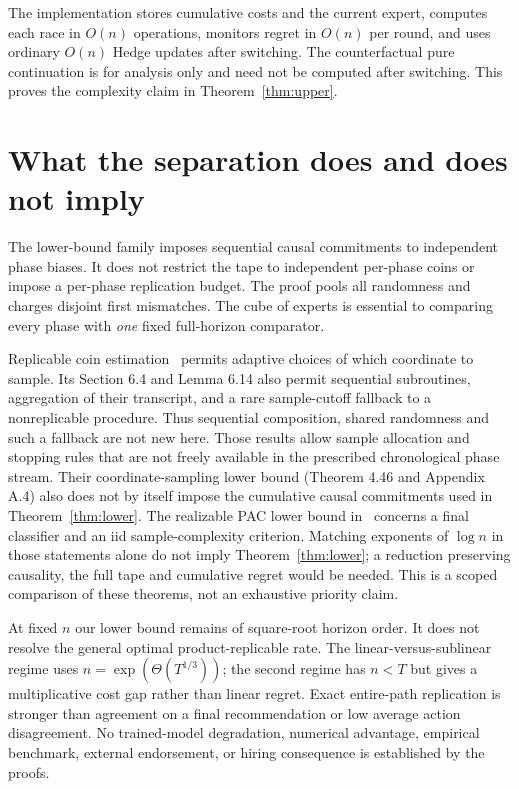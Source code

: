\documentclass[11pt]{article}
\newcommand{\1}{\mathbf 1}
\begin{document}
The implementation stores cumulative costs and the current expert,
computes each race in $O(n)$ operations, monitors regret in $O(n)$
per round, and uses ordinary $O(n)$ Hedge updates after switching.
The counterfactual pure continuation is for analysis only and need
not be computed after switching. This proves the complexity
claim in Theorem~\ref{thm:upper}.

\section{What the separation does and does not imply}\label{sec:discussion}

The lower-bound family imposes sequential causal commitments to
independent phase biases. It does not restrict the tape to independent
per-phase coins or impose a per-phase replication budget.
The proof pools all randomness and charges disjoint first mismatches.
The cube of experts is essential to comparing every phase with
\emph{one} fixed full-horizon comparator.

Replicable coin estimation~\cite{HIKLY} permits adaptive choices of
which coordinate to sample. Its Section 6.4 and Lemma 6.14 also permit
sequential subroutines, aggregation of their transcript, and a rare
sample-cutoff fallback to a nonreplicable procedure. Thus sequential
composition, shared randomness and such a fallback are not new here.
Those results allow sample allocation and stopping rules that are not
freely available in the prescribed chronological phase stream. Their
coordinate-sampling lower bound (Theorem 4.46 and Appendix A.4) also
does not by itself impose the cumulative causal commitments used in
Theorem~\ref{thm:lower}.
The realizable PAC lower bound in~\cite{LMPS} concerns a final
classifier and an iid sample-complexity criterion. Matching exponents
of $\log n$ in those statements alone do not imply
Theorem~\ref{thm:lower}; a reduction preserving causality, the full
tape and cumulative regret would be needed. This is a scoped
comparison of these theorems, not an exhaustive priority claim.

At fixed $n$ our lower bound remains of square-root horizon order.
It does not resolve the general optimal product-replicable rate.
The linear-versus-sublinear regime uses
$n=\exp(\Theta(T^{1/3}))$; the second regime has $n<T$ but gives
a multiplicative cost gap rather than linear regret.
Exact entire-path replication is stronger than agreement on a
final recommendation or low average action disagreement.
No trained-model degradation, numerical advantage, empirical benchmark,
external endorsement, or hiring consequence is established by the proofs.
\end{document}
